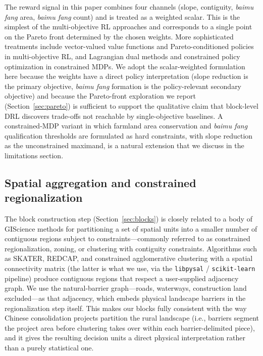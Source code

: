 \documentclass[preprint,12pt]{elsarticle}
\begin{document}
The reward signal in this paper combines four channels (slope, contiguity, \textit{baimu fang} area, \textit{baimu fang} count) and is treated as a weighted scalar. This is the simplest of the multi-objective RL approaches and corresponds to a single point on the Pareto front determined by the chosen weights. More sophisticated treatments include vector-valued value functions and Pareto-conditioned policies in multi-objective RL, and Lagrangian dual methods and constrained policy optimization in constrained MDPs. We adopt the scalar-weighted formulation here because the weights have a direct policy interpretation (slope reduction is the primary objective, \textit{baimu fang} formation is the policy-relevant secondary objective) and because the Pareto-front exploration we report (Section~\ref{sec:pareto}) is sufficient to support the qualitative claim that block-level DRL discovers trade-offs not reachable by single-objective baselines. A constrained-MDP variant in which farmland area conservation and \textit{baimu fang} qualification thresholds are formulated as hard constraints, with slope reduction as the unconstrained maximand, is a natural extension that we discuss in the limitations section.

\subsection{Spatial aggregation and constrained regionalization}

The block construction step (Section~\ref{sec:blocks}) is closely related to a body of GIScience methods for partitioning a set of spatial units into a smaller number of contiguous regions subject to constraints---commonly referred to as constrained regionalization, zoning, or clustering with contiguity constraints. Algorithms such as SKATER, REDCAP, and constrained agglomerative clustering with a spatial connectivity matrix (the latter is what we use, via the \texttt{libpysal} / \texttt{scikit-learn} pipeline) produce contiguous regions that respect a user-supplied adjacency graph. We use the natural-barrier graph---roads, waterways, construction land excluded---as that adjacency, which embeds physical landscape barriers in the regionalization step itself. This makes our blocks fully consistent with the way Chinese consolidation projects partition the rural landscape (i.e., barriers segment the project area before clustering takes over within each barrier-delimited piece), and it gives the resulting decision units a direct physical interpretation rather than a purely statistical one.
\end{document}
